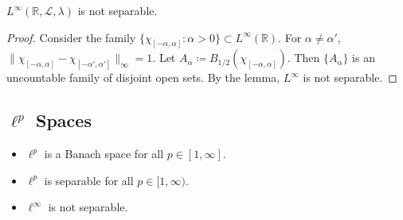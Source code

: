 \begin{theorem}
\( L^\infty(\mathbb{R}, \mathcal{L}, \lambda) \) is not separable.
\end{theorem}

\begin{proof}
Consider the family \( \{\chi_{[-\alpha, \alpha]} : \alpha > 0\} \subset L^\infty(\mathbb{R}) \). For \( \alpha \neq \alpha' \), \( \|\chi_{[-\alpha, \alpha]} - \chi_{[-\alpha', \alpha']}\|_\infty = 1 \). Let \( A_\alpha \coloneqq B_{1/2}(\chi_{[-\alpha, \alpha]}) \). Then \( \{A_\alpha\} \) is an uncountable family of disjoint open sets. By the lemma, \( L^\infty \) is not separable.
\end{proof}

\subsection{\( \ell^p \) Spaces}

\begin{itemize}
    \item \( \ell^p \) is a Banach space for all \( p \in [1, \infty] \).
    \item \( \ell^p \) is separable for all \( p \in [1, \infty) \).
    \item \( \ell^\infty \) is not separable.
\end{itemize}
